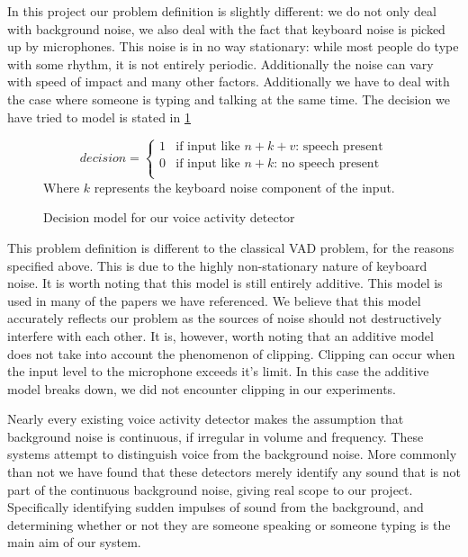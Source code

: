 \documentclass[ %
                    author={Sam Phippen},
                supervisor={Dr. Rafal Bogacz},
                     title={Real time voice activity detectors in noisy personal computing environments},
                  subtitle={},
                    degree={MEng},
                      year={2012} ]{thesis}
\begin{document}
In this project our problem definition is slightly different: we do not only
deal with background noise, we also deal with the fact that keyboard noise is
picked up by microphones. This noise is in no way stationary: while most people
do type with some rhythm, it is not entirely periodic. Additionally the noise
can vary with speed of impact and many other factors. Additionally we have
to deal with the case where someone is typing and talking at the same time.
The decision we have tried to model is stated in \ref{eqn:decision 2}

\begin{figure}
\[ decision = \left\{ \begin{array}{ll}
            1 & \mbox{if input like $n + k + v$: speech present}\\
            0 & \mbox{if input like $n + k$: no speech present}\\

    \end{array} \right. \]
            \label{eqn:decision 2}
            Where $k$ represents the keyboard noise component of the input.
            \caption{Decision model for our voice activity detector}
\end{figure}

This problem definition is different to the classical VAD problem, for the
reasons specified above. This is due to the highly non-stationary nature of
keyboard noise. It is worth noting that this model is still entirely additive.
This model is used in many of the papers we have referenced. We believe that
this model accurately reflects our problem as the sources of noise should not
destructively interfere with each other. It is, however, worth noting that an
additive model does not take into account the phenomenon of clipping. Clipping
can occur when the input level to the microphone exceeds it's limit. In this
case the additive model breaks down, we did not encounter clipping in our
experiments.

Nearly every existing voice activity detector makes the assumption that
background noise is continuous, if irregular in volume and frequency. These
systems attempt to distinguish voice from the background noise. More commonly
than not we have found that these detectors merely identify any sound that is
not part of the continuous background noise, giving real scope to our project.
Specifically identifying sudden impulses of sound from the background, and
determining whether or not they are someone speaking or someone typing is the
main aim of our system.
\end{document}
